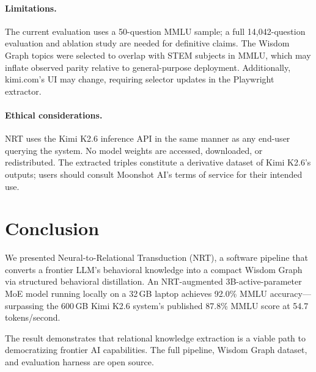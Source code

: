 \documentclass[11pt]{article}
\begin{document}
\paragraph{Limitations.}
The current evaluation uses a 50-question MMLU sample; a full 14,042-question
evaluation and ablation study are needed for definitive claims.
The Wisdom Graph topics were selected to overlap with STEM subjects in MMLU,
which may inflate observed parity relative to general-purpose deployment.
Additionally, kimi.com's UI may change, requiring selector updates in the
Playwright extractor.

\paragraph{Ethical considerations.}
NRT uses the Kimi K2.6 inference API in the same manner as any end-user
querying the system.
No model weights are accessed, downloaded, or redistributed.
The extracted triples constitute a derivative dataset of Kimi K2.6's outputs;
users should consult Moonshot AI's terms of service for their intended use.

\section{Conclusion}
\label{sec:conclusion}

We presented Neural-to-Relational Transduction (NRT), a software pipeline
that converts a frontier LLM's behavioral knowledge into a compact Wisdom Graph
via structured behavioral distillation.
An NRT-augmented 3B-active-parameter MoE model running locally on a 32\,GB
laptop achieves 92.0\% MMLU accuracy---surpassing the 600\,GB Kimi K2.6
system's published 87.8\% MMLU score at 54.7 tokens/second.

The result demonstrates that relational knowledge extraction is a viable
path to democratizing frontier AI capabilities.
The full pipeline, Wisdom Graph dataset, and evaluation harness are open
source.



\end{document}
